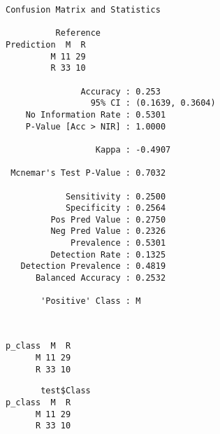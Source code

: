 \documentclass[]{book}
\newenvironment{Shaded}{\begin{snugshade}}{\end{snugshade}}
\newcommand{\KeywordTok}[1]{\textcolor[rgb]{0.13,0.29,0.53}{\textbf{#1}}}
\newcommand{\StringTok}[1]{\textcolor[rgb]{0.31,0.60,0.02}{#1}}
\newcommand{\CommentTok}[1]{\textcolor[rgb]{0.56,0.35,0.01}{\textit{#1}}}
\newcommand{\OperatorTok}[1]{\textcolor[rgb]{0.81,0.36,0.00}{\textbf{#1}}}
\newcommand{\NormalTok}[1]{#1}
\begin{document}
\begin{verbatim}
Confusion Matrix and Statistics

          Reference
Prediction  M  R
         M 11 29
         R 33 10
                                          
               Accuracy : 0.253           
                 95% CI : (0.1639, 0.3604)
    No Information Rate : 0.5301          
    P-Value [Acc > NIR] : 1.0000          
                                          
                  Kappa : -0.4907         
                                          
 Mcnemar's Test P-Value : 0.7032          
                                          
            Sensitivity : 0.2500          
            Specificity : 0.2564          
         Pos Pred Value : 0.2750          
         Neg Pred Value : 0.2326          
             Prevalence : 0.5301          
         Detection Rate : 0.1325          
   Detection Prevalence : 0.4819          
      Balanced Accuracy : 0.2532          
                                          
       'Positive' Class : M               
                                          
\end{verbatim}

\begin{Shaded}
\end{Shaded}

\begin{verbatim}
       
p_class  M  R
      M 11 29
      R 33 10
\end{verbatim}

\begin{Shaded}
\end{Shaded}

\begin{verbatim}
       test$Class
p_class  M  R
      M 11 29
      R 33 10
\end{verbatim}
\end{document}
